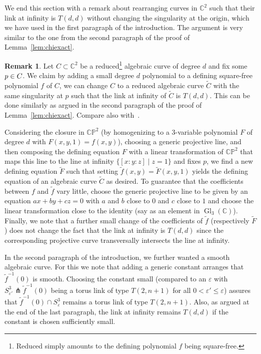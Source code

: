 \documentclass[10pt,a4paper]{article}
\theoremstyle{definition}
\newtheorem{rema}[theo]{Remark}
\numberwithin{equation}{section}
\DeclareMathOperator{\Gl}{Gl}
\renewcommand*\epsilon{\varepsilon}
\newcommand*\C{\mathbb{C}}
\renewcommand*\P{\mathbb{P}}
\let\oldin\in
\renewcommand{\in}{\mathchoice{\oldin}{\oldin}{\,\oldin\,}{\,\oldin\,}}
\begin{document}
We end this section with a remark about rearranging curves in $\C^2$ such that their link at infinity is $T(d,d)$ without changing the singularity at the origin, which we have used in the first paragraph of the introduction. The argument is very similar to the one from the second paragraph of the proof of Lemma~\ref{lem:chiexact}.
\begin{rema}\label{rem:T(d,d)atinfty}
Let $C\subset\C^2$ be a reduced\footnote{Reduced simply amounts to the defining polynomial $f$ being square-free.} algebraic curve of degree $d$ and fix some $p\in C$. We claim by adding a small degree $d$ polynomial to a defining square-free polynomial $f$ of $C$, we can change $C$ to a reduced algebraic curve $\widetilde{C}$ with the same singularity at $p$ such that the link at infinity of $\widetilde{C}$ is $T(d,d)$. This can be done similarly as argued in the second paragraph of the proof of Lemma~\ref{lem:chiexact}. Compare also with~\cite[Section~2]{Feller_15_MinCobBetweenTorusknots}.

Considering the closure in $\C\P^2$ (by homogenizing to a 3-variable polynomial $F$ of degree $d$ with $F(x,y,1)=f(x,y)$), choosing a generic projective line, and then composing the defining equation $F$ with a linear transformation of $\C\P^2$ that maps this line to the line at infinity $\{[x:y:z]\mid z=1\}$ and fixes $p$, we find a new defining equation $\widetilde{F}$ such that setting $\widetilde{f}(x,y)=\widetilde{F}(x,y,1)$ yields the defining equation of an algebraic curve $\widetilde{C}$ as desired. To guarantee that the coefficients between $f$ and $\widetilde{f}$ vary little, choose the generic projective line to be given by an equation $ax+by+cz=0$ with $a$ and $b$ close to $0$ and $c$ close to $1$ and choose the linear transformation close to the identity (say as an element in $\Gl_3(\C)$). Finally, we note that a further small change of the coefficients of $\widetilde{f}$ (respectively $\widetilde{F}$) does not change the fact that the link at infinity is $T(d,d)$ since the corresponding projective curve transversally intersects the line at infinity.

In the second paragraph of the introduction, we further wanted a smooth algebraic curve. For this we note that adding a generic constant arranges that $\widetilde{f}^{-1}(0)$ is smooth. Choosing the constant small (compared to an $\epsilon$ with $S^3_{\epsilon'}\pitchfork \widetilde{f}^{-1}(0)$ being a torus link of type $T(2,n+1)$ for all $0<\epsilon'\leq\epsilon$) assures that $\widetilde{f}^{-1}(0) \cap S^3_\epsilon$ remains a torus link of type $T(2,n+1)$. Also, as argued at the end of the last paragraph, the link at infinity remains $T(d,d)$ if the constant is chosen sufficiently small.
\end{rema}
\end{document}
